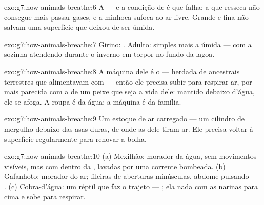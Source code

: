 \begin{solution}{exo:g7:how-animals-breathe:6}
A  --- e a condição de  é que falha: a 
que resseca não consegue mais passar gases, e a minhoca sufoca ao ar
livre. Grande e fina não salvam uma superfície que deixou de ser
úmida.
\end{solution}

\begin{solution}{exo:g7:how-animals-breathe:7}
Girino: . Adulto:  simples mais a  úmida --- com a
 sozinha atendendo durante o inverno em torpor no fundo da lagoa.
\end{solution}

\begin{solution}{exo:g7:how-animals-breathe:8}
A máquina dele é o  --- herdada de ancestrais terrestres que
alimentavam com  --- então ele precisa subir para respirar ar, por
mais parecida com a de um peixe que seja a vida dele: mantido debaixo
d'água, ele se afoga. A roupa é da água; a máquina é da família.
\end{solution}

\begin{solution}{exo:g7:how-animals-breathe:9}
Um estoque de ar carregado --- um cilindro de mergulho debaixo das asas
duras, de onde as  dele tiram ar. Ele precisa voltar à
superfície regularmente para renovar a bolha.
\end{solution}

\begin{solution}{exo:g7:how-animals-breathe:10}
(a) Mexilhão: morador da água, sem movimentos visíveis, mas com
 dentro da , lavadas por uma corrente bombeada. (b)
Gafanhoto: morador do ar; fileiras de aberturas minúsculas, abdome
pulsando --- . (c) Cobra-d'água: um réptil que faz o trajeto
--- ; ela nada com as narinas para cima e sobe para respirar.
\end{solution}

